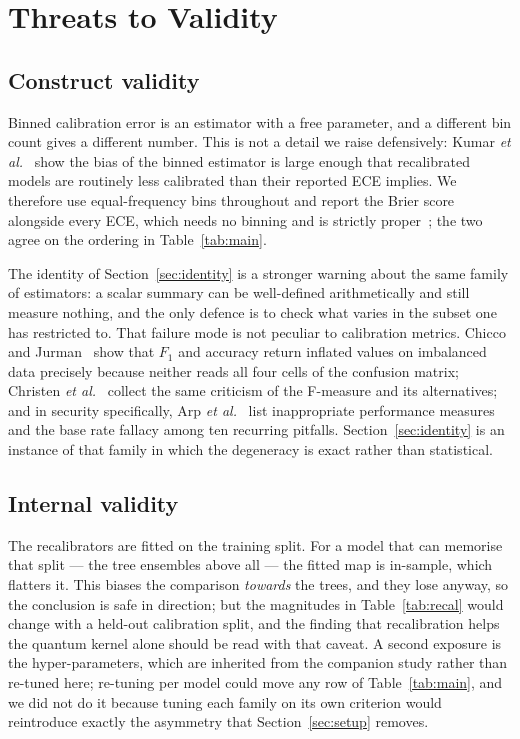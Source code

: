 \documentclass[journal]{IEEEtran}
\begin{document}
\section{Threats to Validity}\label{sec:limits}

\subsection{Construct validity}
Binned calibration error is an estimator with a free parameter, and a
different bin count gives a different number. This is not a detail we
raise defensively: Kumar \emph{et al.}~\cite{kumar2019verified} show the
bias of the binned estimator is large enough that recalibrated models are
routinely less calibrated than their reported ECE implies. We therefore use
equal-frequency bins throughout and report the Brier score alongside every
ECE, which needs no binning and is strictly
proper~\cite{gneiting2007scoring}; the two agree on the ordering in
Table~\ref{tab:main}.

The identity of Section~\ref{sec:identity} is a stronger warning about the
same family of estimators: a scalar summary can be well-defined
arithmetically and still measure nothing, and the only defence is to check
what varies in the subset one has restricted to. That failure mode is not
peculiar to calibration metrics. Chicco and
Jurman~\cite{chicco2020advantages} show that $F_1$ and accuracy return
inflated values on imbalanced data precisely because neither reads all four
cells of the confusion matrix; Christen \emph{et
al.}~\cite{christen2023review} collect the same criticism of the F-measure
and its alternatives; and in security specifically, Arp \emph{et
al.}~\cite{arp2022dosdonts} list inappropriate performance measures and the
base rate fallacy among ten recurring pitfalls. Section~\ref{sec:identity}
is an instance of that family in which the degeneracy is exact rather than
statistical.

\subsection{Internal validity}
The recalibrators are fitted on the training split. For a model that can
memorise that split --- the tree ensembles above all --- the fitted map is
in-sample, which flatters it. This biases the comparison \emph{towards} the
trees, and they lose anyway, so the conclusion is safe in direction; but the
magnitudes in Table~\ref{tab:recal} would change with a held-out
calibration split, and the finding that recalibration helps the quantum
kernel alone should be read with that caveat. A second exposure is the
hyper-parameters, which are inherited from the companion study rather than
re-tuned here; re-tuning per model could move any row of
Table~\ref{tab:main}, and we did not do it because tuning each family on its
own criterion would reintroduce exactly the asymmetry that
Section~\ref{sec:setup} removes.
\end{document}
